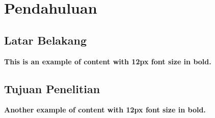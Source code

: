 \documentclass[12pt]{article}
\begin{document}
\thispagestyle{empty}


\pagestyle{plain}

\singlespacing
\tableofcontents
\newpage

\onehalfspacing

\setlength{\parindent}{1.5em}

\section{Pendahuluan}
\subsection{Latar Belakang}
{\bfseries \fontsize{12}{14}\selectfont This is an example of content with 12px font size in bold.}
\lipsum[1]

\subsection{Tujuan Penelitian}
{\bfseries \fontsize{12}{14}\selectfont Another example of content with 12px font size in bold.}
\lipsum[2]
\end{document}
